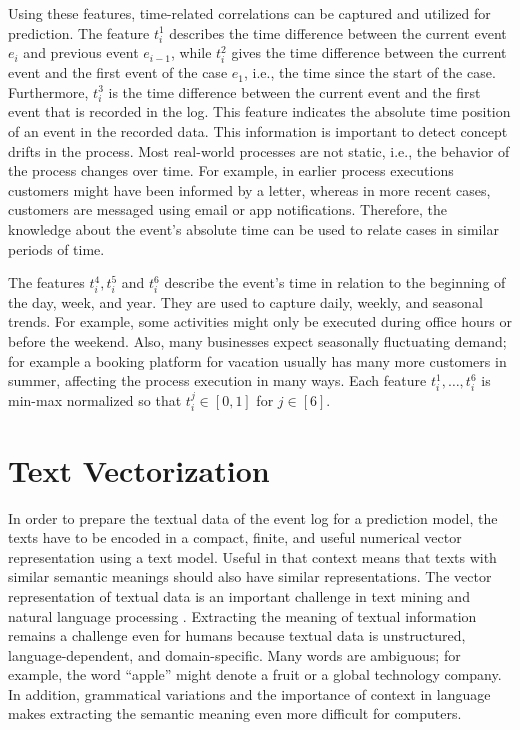 Using these features, time-related correlations can be captured and utilized for prediction.
The feature $t_i^1$ describes the time difference between the current event $e_i$ and previous event $e_{i-1}$, while $t_i^2$ gives the time difference between the current event and the first event of the case $e_1$, i.e., the time since the start of the case.
Furthermore, $t_i^3$ is the time difference between the current event and the first event that is recorded in the log.
This feature indicates the absolute time position of an event in the recorded data.
This information is important to detect concept drifts \cite{DBLP:journals/tnn/BoseAZP14} in the process.
Most real-world processes are not static, i.e., the behavior of the process changes over time.
For example, in earlier process executions customers might have been informed by a letter, whereas in more recent cases, customers are messaged using email or app notifications.
Therefore, the knowledge about the event’s absolute time can be used to relate cases in similar periods of time.

The features $t_i^4, t_i^5$ and $t_i^6$ describe the event’s time in relation to the beginning of the day, week, and year.
They are used to capture daily, weekly, and seasonal trends.
For example, some activities might only be executed during office hours or before the weekend.
Also, many businesses expect seasonally fluctuating demand; for example a booking platform for vacation usually has many more customers in summer, affecting the process execution in many ways.
Each feature $t_i^1, \dots, t_i^6$ is min-max normalized so that $t_i^j \in [0,1]$ for $j \in [6]$.

\section{Text Vectorization}\label{sec:text}

In order to prepare the textual data of the event log for a prediction model, the texts have to be encoded in a compact, finite, and useful numerical vector representation using a text model.
Useful in that context means that texts with similar semantic meanings should also have similar representations.
The vector representation of textual data is an important challenge in text mining and natural language processing \cite{DBLP:books/daglib/0001548}.
Extracting the meaning of textual information remains a challenge even for humans because textual data is unstructured, language-dependent, and domain-specific.
Many words are ambiguous; for example, the word \enquote{apple} might denote a fruit or a global technology company.
In addition, grammatical variations and the importance of context in language makes extracting the semantic meaning even more difficult for computers.

